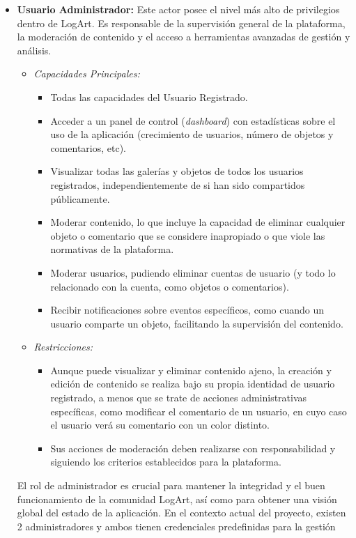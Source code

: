 \begin{itemize}
    \item \textbf{Usuario Administrador:}
    Este actor posee el nivel más alto de privilegios dentro de LogArt. Es responsable de la supervisión general de la plataforma, la moderación de contenido y el acceso a herramientas avanzadas de gestión y análisis.
    \begin{itemize}
        \item \textit{Capacidades Principales:}
        \begin{itemize}
            \item Todas las capacidades del Usuario Registrado.
            \item Acceder a un panel de control (\textit{dashboard}) con estadísticas sobre el uso de la aplicación (crecimiento de usuarios, número de objetos y comentarios, etc).
            \item Visualizar todas las galerías y objetos de todos los usuarios registrados, independientemente de si han sido compartidos públicamente.
            \item Moderar contenido, lo que incluye la capacidad de eliminar cualquier objeto o comentario que se considere inapropiado o que viole las normativas de la plataforma.
            \item Moderar usuarios, pudiendo eliminar cuentas de usuario (y todo lo relacionado con la cuenta, como objetos o comentarios).
            \item Recibir notificaciones sobre eventos específicos, como cuando un usuario comparte un objeto, facilitando la supervisión del contenido.
        \end{itemize}
    \item \textit{Restricciones:}
    \begin{itemize}
        \item Aunque puede visualizar y eliminar contenido ajeno, la creación y edición de contenido se realiza bajo su propia identidad de usuario registrado, a menos que se trate de acciones administrativas específicas, como modificar el comentario de un usuario, en cuyo caso el usuario verá su comentario con un color distinto.
        \item Sus acciones de moderación deben realizarse con responsabilidad y siguiendo los criterios establecidos para la plataforma.
    \end{itemize}
    \end{itemize}
    El rol de administrador es crucial para mantener la integridad y el buen funcionamiento de la comunidad LogArt, así como para obtener una visión global del estado de la aplicación. En el contexto actual del proyecto, existen 2 administradores y ambos tienen credenciales predefinidas para la gestión
\end{itemize}

